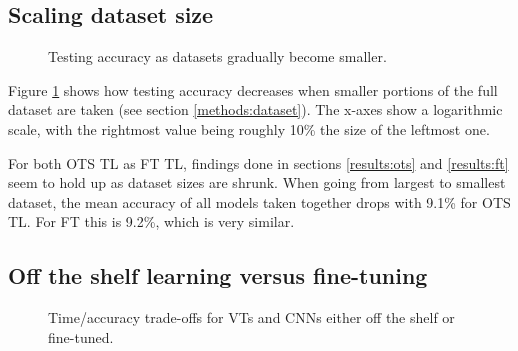 \subsection{Scaling dataset size}

\begin{figure}[tb]
    \centering
    \def\svgwidth{\textwidth}
    
    \caption{Testing accuracy as datasets gradually become smaller.}
    \label{results:img:scale}
\end{figure}

%    
%    

Figure \ref{results:img:scale} shows how testing accuracy decreases when smaller portions of the full dataset are taken (see section \ref{methods:dataset}). The x-axes show a logarithmic scale, with the rightmost value being roughly 10\% the size of the leftmost one.

For both OTS TL as FT TL, findings done in sections \ref{results:ots} and \ref{results:ft} seem to hold up as dataset sizes are shrunk. When going from largest to smallest dataset, the mean accuracy of all models taken together drops with 9.1\% for OTS TL. For FT this is 9.2\%, which is very similar.

\subsection{Off the shelf learning versus fine-tuning}

\begin{figure}[tbh]
    \centering
    \def\svgwidth{7.7cm}
    
    \caption{Time/accuracy trade-offs for VTs and CNNs either off the shelf or fine-tuned.}
    \label{results:img:ots_vs_ft_type}
\end{figure}


